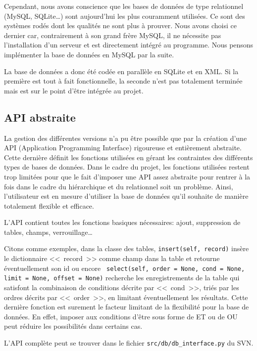\documentclass[final,11pt,a4paper,twoside,titlepage]{article}
\newcommand{\p}{\vspace{0.3em}}
\newcommand{\code}[1]{\texttt{#1}}
\begin{document}
{  Cependant, nous avons conscience que les bases de données de type relationnel (MySQL, 
  SQLite\ldots) sont aujourd'hui les plus couramment utilisées. Ce sont des systèmes rodés 
  dont les qualités ne sont plus à prouver. Nous avons choisi ce dernier car, contrairement 
  à son grand frère MySQL, il ne 
  nécessite pas l'installation d'un serveur et est directement intégré au programme. Nous 
  pensons implémenter la base de données en MySQL par la suite.\p
  
  La base de données a donc été codée en parallèle en SQLite et en XML. Si la première est
  tout à fait fonctionnelle, la seconde n'est pas totalement terminée mais est sur le point
  d'être intégrée au projet.

    \subsection{API abstraite}
    La gestion des différentes versions n'a pu être possible que par la création d'une API 
    (Application Programming Interface) rigoureuse et entièrement abstraite. Cette dernière 
    définit les fonctions utilisées en gérant les contraintes des différents types de bases 
    de données. Dans le cadre du projet, les fonctions utilisées restent trop limitées pour 
    que le fait d'imposer une API assez abstraite pour rentrer à la fois dans le cadre du 
    hiérarchique et du relationnel soit un problème. Ainsi, l'utilisateur est en mesure 
    d'utiliser la base de données qu'il souhaite de manière totalement flexible et efficace.\p
    
    L'API contient toutes les fonctions basiques nécessaires: ajout,
    suppression de tables, champs,
    verrouillage\ldots \p
    
    Citons comme exemples, dans la classe des tables,
    \code{insert(self, record)} insère le dictionnaire 
    <<~record~>> comme champ dans la table et retourne éventuellement
    son id ou encore ~\code{select(self, order = None, cond = None,
    limit = None, offset = None)} recherche les enregistrements 
    de la table qui satisfont la combinaison de conditions décrite par
    <<~cond~>>, triés par les ordres 
    décrits par <<~order~>>, en limitant éventuellement les résultats. Cette dernière fonction est
    surement le facteur limitant de la flexibilité pour la base de données. En effet, imposer aux
    conditions d'être sous forme de ET ou de OU peut réduire les
    possibilités dans certains cas. \p
    
    L'API complète peut se trouver dans le fichier \code{src/db/db\_interface.py} du SVN.
   


}
\end{document}
